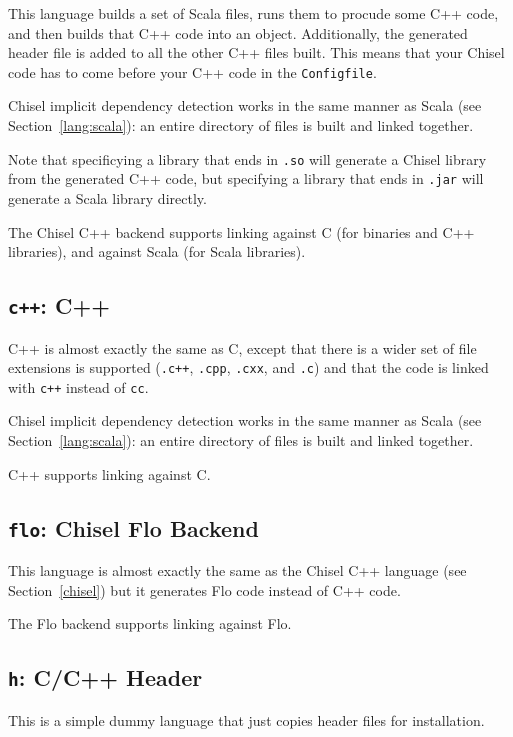 \documentclass{article}
\begin{document}
This language builds a set of Scala files, runs them to procude some
C++ code, and then builds that C++ code into an object.  Additionally,
the generated header file is added to all the other C++ files built.
This means that your Chisel code has to come before your C++ code in
the \texttt{Configfile}.

Chisel implicit dependency detection works in the same manner as Scala
(see Section~\ref{lang:scala}): an entire directory of files is built
and linked together.

Note that specificying a library that ends in \texttt{.so} will
generate a Chisel library from the generated C++ code, but specifying
a library that ends in \texttt{.jar} will generate a Scala library
directly.

The Chisel C++ backend supports linking against C (for binaries and
C++ libraries), and against Scala (for Scala libraries).

\subsection{\texttt{c++}: C++}

C++ is almost exactly the same as C, except that there is a wider set
of file extensions is supported (\texttt{.c++}, \texttt{.cpp},
\texttt{.cxx}, and \texttt{.c}) and that the code is linked with
\texttt{c++} instead of \texttt{cc}.

Chisel implicit dependency detection works in the same manner as Scala
(see Section~\ref{lang:scala}): an entire directory of files is built
and linked together.

C++ supports linking against C.

\subsection{\texttt{flo}: Chisel Flo Backend}

This language is almost exactly the same as the Chisel C++ language
(see Section~\ref{chisel}) but it generates Flo code instead of C++
code.

The Flo backend supports linking against Flo.

\subsection{\texttt{h}: C/C++ Header}

This is a simple dummy language that just copies header files for
installation.
\end{document}

